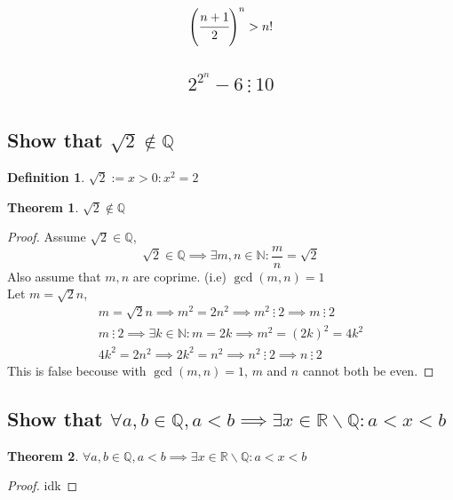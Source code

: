 \documentclass[]{article}
\newcommand{\R}{\mathbb{R}}
\newcommand{\N}{\mathbb{N}}
\newcommand{\Q}{\mathbb{Q}}
\newcommand{\divisible}{ \ \vdots \ }
\newtheorem{definition}{Definition}
\newtheorem{theorem}{Theorem}
\begin{document}
\subsection{
    $$\qty(\cfrac{n+1}{2})^n > n!$$
}





\subsection{
    $$2^{2^n} - 6 \divisible 10$$
}






\newpage
\section{}

\subsection{Show that $\sqrt{2} \notin \Q$}
\begin{definition}
    $\sqrt{2} := x > 0 : x^2 = 2$
\end{definition}
\begin{theorem}
    $\sqrt{2} \notin \Q$
\end{theorem}
\begin{proof}
    Assume $\sqrt{2} \in \Q$,
    $$\sqrt{2} \in \Q \implies \exists m,n \in \N : \frac{m}{n} = \sqrt{2}$$
    Also assume that $m,n$ are coprime. (i.e) $\gcd(m,n)=1$\\
    Let $m = \sqrt{2} n$,
    \begin{align*}
        m = \sqrt{2} n \implies m^2 = 2 n^2 \implies m^2 \divisible 2 \implies m \divisible 2\\
        m \divisible 2 \implies \exists k \in \N : m = 2k \implies m^2 = (2k)^2 = 4 k^2\\
        4k^2 = 2 n^2 \implies 2k^2 = n^2 \implies n^2 \divisible 2 \implies n \divisible 2
    \end{align*}
    This is false becouse with $\gcd(m,n)=1$, $m$ and $n$ cannot both be even.
\end{proof}

\subsection{Show that 
    $\forall a,b \in \Q, a < b \implies \exists x \in \R \backslash \Q : a < x < b$
}
\begin{theorem}
    $\forall a,b \in \Q, a < b \implies \exists x \in \R \backslash \Q : a < x < b$
\end{theorem}
\begin{proof}
    idk
\end{proof}
\end{document}

